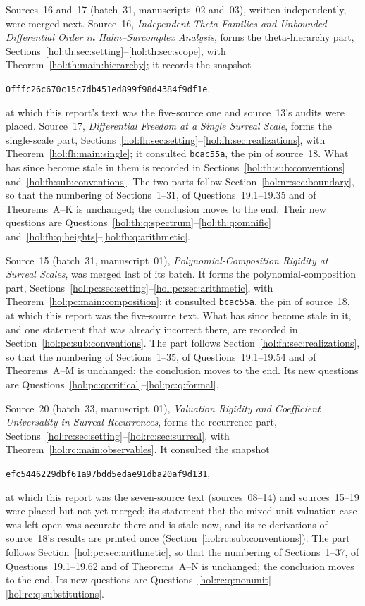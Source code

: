 \documentclass[11pt]{article}
\numberwithin{equation}{section}
\theoremstyle{definition}
\theoremstyle{remark}
\begin{document}
Sources~16 and~17 (batch~31, manuscripts~02 and~03), written independently,
were merged next. Source~16, \emph{Independent Theta Families and Unbounded
Differential Order in Hahn--Surcomplex Analysis}, forms the theta-hierarchy
part, Sections~\ref{hol:th:sec:setting}--\ref{hol:th:sec:scope}, with
Theorem~\ref{hol:th:main:hierarchy}; it records the snapshot
\begin{center}\small\texttt{0fffc26c670c15c7db451ed899f98d4384f9df1e},\end{center}
at which this report's text was the five-source one and source~13's audits
were placed. Source~17, \emph{Differential Freedom at a Single Surreal Scale},
forms the single-scale part,
Sections~\ref{hol:fh:sec:setting}--\ref{hol:fh:sec:realizations}, with
Theorem~\ref{hol:fh:main:single}; it consulted \texttt{bcac55a}, the pin of
source~18. What has since become stale in them is recorded in
Sections~\ref{hol:th:sub:conventions} and~\ref{hol:fh:sub:conventions}. The two
parts follow Section~\ref{hol:nr:sec:boundary}, so that the numbering of
Sections~1--31, of Questions~19.1--19.35 and of Theorems~A--K is unchanged; the
conclusion moves to the end. Their new questions are
Questions~\ref{hol:th:q:spectrum}--\ref{hol:th:q:omnific}
and~\ref{hol:fh:q:heights}--\ref{hol:fh:q:arithmetic}.

Source~15 (batch~31, manuscript~01), \emph{Polynomial-Composition Rigidity at
Surreal Scales}, was merged last of its batch. It forms the
polynomial-composition part,
Sections~\ref{hol:pc:sec:setting}--\ref{hol:pc:sec:arithmetic}, with
Theorem~\ref{hol:pc:main:composition}; it consulted \texttt{bcac55a}, the pin
of source~18, at which this report was the five-source text. What has since
become stale in it, and one statement that was already incorrect there, are
recorded in Section~\ref{hol:pc:sub:conventions}. The part follows
Section~\ref{hol:fh:sec:realizations}, so that the numbering of
Sections~1--35, of Questions~19.1--19.54 and of Theorems~A--M is unchanged;
the conclusion moves to the end. Its new questions are
Questions~\ref{hol:pc:q:critical}--\ref{hol:pc:q:formal}.

Source~20 (batch~33, manuscript~01), \emph{Valuation Rigidity and
Coefficient Universality in Surreal Recurrences}, forms the recurrence part,
Sections~\ref{hol:rc:sec:setting}--\ref{hol:rc:sec:surreal}, with
Theorem~\ref{hol:rc:main:observables}. It consulted the snapshot
\begin{center}\small\texttt{efc5446229dbf61a97bdd5edae91dba20af9d131},\end{center}
at which this report was the seven-source text (sources~08--14) and
sources~15--19 were placed but not yet merged; its statement that the mixed
unit-valuation case was left open was accurate there and is stale now, and its
re-derivations of source~18's results are printed once
(Section~\ref{hol:rc:sub:conventions}). The part follows
Section~\ref{hol:pc:sec:arithmetic}, so that the numbering of
Sections~1--37, of Questions~19.1--19.62 and of Theorems~A--N is unchanged;
the conclusion moves to the end. Its new questions are
Questions~\ref{hol:rc:q:nonunit}--\ref{hol:rc:q:substitutions}.
\end{document}
